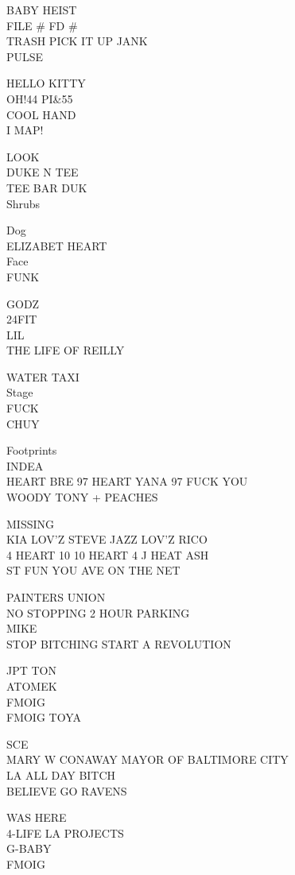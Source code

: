 \documentclass[10pt,letterpaper]{article}
\begin{document}
BABY HEIST\\
FILE \# FD \#\\
TRASH PICK IT UP JANK\\
PULSE

HELLO KITTY\\
OH!44 PI\&55\\
COOL HAND\\
I MAP!

LOOK\\
DUKE N TEE\\
TEE BAR DUK\\
Shrubs

Dog\\
ELIZABET HEART\\
Face\\
FUNK

GODZ\\
24FIT\\
LIL\\
THE LIFE OF REILLY

WATER TAXI\\
Stage\\
FUCK\\
CHUY

Footprints\\
INDEA\\
HEART BRE 97 HEART YANA 97 FUCK YOU\\
WOODY TONY + PEACHES

MISSING\\
KIA LOV'Z STEVE JAZZ LOV'Z RICO\\
4 HEART 10 10 HEART 4 J HEAT ASH\\
ST FUN YOU AVE ON THE NET

PAINTERS UNION\\
NO STOPPING 2 HOUR PARKING\\
MIKE\\
STOP BITCHING START A REVOLUTION

JPT TON\\
ATOMEK\\
FMOIG\\
FMOIG TOYA

SCE\\
MARY W CONAWAY MAYOR OF BALTIMORE CITY\\
LA ALL DAY BITCH\\
BELIEVE GO RAVENS

WAS HERE\\
4{-}LIFE LA PROJECTS\\
G{-}BABY\\
FMOIG
\end{document}
